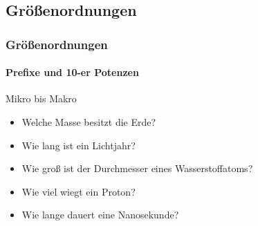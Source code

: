 \subsection*{\label{subsec0003.1_magnitude}Gr\"o\ss{}enordnungen}
\begin{frame}
  \frametitle{Gr\"o\ss{}enordnungen}
  \framesubtitle{Prefixe und 10-er Potenzen}
  \begin{block}{Mikro bis Makro}
    \pause 
    \begin{itemize}
      \item <+-> Welche Masse besitzt die Erde? 
      \item <+-> Wie lang ist ein Lichtjahr? 
      \item <+-> Wie groß ist der Durchmesser eines Wasserstoffatoms?
      \item <+-> Wie viel wiegt ein Proton? 
      \item <+-> Wie lange dauert eine Nanosekunde?
    \end{itemize}
    \ifteacher{%
    \begin{itemize}
      \item <+-> 5\,970\,000\,000\,000\,000\,000\,000\,000 kg oder $5{,}97 \times 10^{24}$ kg 
      \item <+-> 9\,460\,000\,000\,000\,000 m oder $9{,}46 \times 10^{15}$ m 
      \item <+-> 0,000\,000\,000\,1 m oder $1 \times 10^{-10}$ m 
      \item <+-> 0,000\,000\,000\,000\,000\,000\,000\,000\,001\,67 kg $1{,}67 \times 10^{-27}$ kg 
      \item <+-> 0,000\,000\,001 s oder $1 \times 10^{-9}$ s 
    \end{itemize}
    }
    \else
    \rule[0pt]{0mm}{6\baselineskip}
    \fi
  \end{block} 
  \parbox[t]{0.2\linewidth}{
  }\parbox[t]{0.69\linewidth}{
  }
\end{frame}

